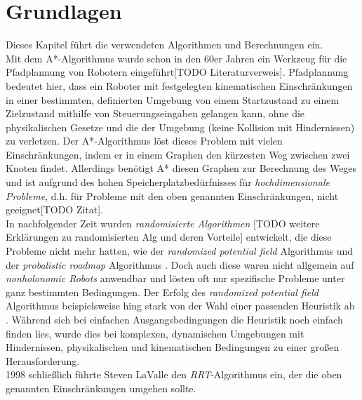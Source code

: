 \section{Grundlagen}
\label{Grundlagen}
Dieses Kapitel führt die verwendeten Algorithmen und Berechnungen ein.\\
Mit dem A*-Algorithmus wurde schon in den 60er Jahren ein Werkzeug für die Pfadplannung von Robotern eingeführt[TODO Literaturverweis]. Pfadplannung bedeutet hier, dass ein Roboter mit festgelegten kinematischen Einschränkungen in einer bestimmten, definierten Umgebung von einem Startzustand zu einem Zielzustand mithilfe von Steuerungseingaben gelangen kann, ohne die physikalischen Gesetze und die der Umgebung (keine Kollision mit Hindernissen) zu verletzen. Der A*-Algorithmus löst dieses Problem mit vielen Einschränkungen, indem er in einem Graphen den kürzesten Weg zwischen zwei Knoten findet. Allerdings benötigt A* diesen Graphen zur Berechnung des Weges und ist aufgrund des hohen Speicherplatzbedürfnisses für \textit{hochdimensionale Probleme}, d.h. für Probleme mit den oben genannten Einschränkungen, nicht geeignet[TODO Zitat].\\
In nachfolgender Zeit wurden \textit{randomisierte Algorithmen} [TODO weitere Erklärungen zu randomisierten Alg und deren Vorteile] entwickelt, die diese Probleme nicht mehr hatten, wie der \textit{randomized potential field} Algorithmus \citep{BaLa91} und der \textit{probalistic roadmap} Algorithmus \citep{AmWu96}. Doch auch diese waren nicht allgemein auf \textit{nonholonomic Robots} anwendbar und lösten oft nur spezifische Probleme unter ganz bestimmten Bedingungen. Der Erfolg des \textit{randomized potential field} Algorithmus beispielsweise hing stark von der Wahl einer passenden Heuristik ab \citep[vgl. Kap 3.4][]{BaLa91}. Während sich bei einfachen Ausgangsbedingungen die Heuristik noch einfach finden lies, wurde dies bei komplexen, dynamischen Umgebungen mit Hindernissen, physikalischen und kinematischen Bedingungen zu einer großen Herausforderung. \\
1998 schließlich führte Steven LaValle den \textit{RRT}-Algorithmus ein, der die oben genannten Einschränkungen umgehen sollte.

